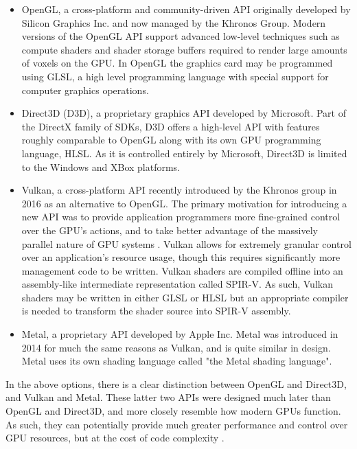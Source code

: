 \begin{itemize}
    \item OpenGL, a cross-platform and community-driven API originally developed by Silicon Graphics Inc. and now managed by the Khronos Group. Modern versions of the OpenGL API support advanced low-level techniques such as compute shaders and shader storage buffers required to render large amounts of voxels on the GPU. In OpenGL the graphics card may be programmed using GLSL, a high level programming language with special support for computer graphics operations.
    
    \item Direct3D (D3D), a proprietary graphics API developed by Microsoft. Part of the DirectX family of SDKs, D3D offers a high-level API with features roughly comparable to OpenGL along with its own GPU programming language, HLSL. As it is controlled entirely by Microsoft, Direct3D is limited to the Windows and XBox platforms.
    
    \item Vulkan, a cross-platform API recently introduced by the Khronos group in 2016 as an alternative to OpenGL. The primary motivation for introducing a new API was to provide application programmers more fine-grained control over the GPU's actions, and to take better advantage of the massively parallel nature of GPU systems . Vulkan allows for extremely granular control over an application's resource usage, though this requires significantly more management code to be written. Vulkan shaders are compiled offline into an assembly-like intermediate representation called SPIR-V. As such, Vulkan shaders may be written in either GLSL or HLSL but an appropriate compiler is needed to transform the shader source into SPIR-V assembly.
    
    \item Metal, a proprietary API developed by Apple Inc. Metal was introduced in 2014 for much the same reasons as Vulkan, and is quite similar in design. Metal uses its own shading language called "the Metal shading language".
\end{itemize}

In the above options, there is a clear distinction between OpenGL and Direct3D, and Vulkan and Metal. These latter two APIs were designed much later than OpenGL and Direct3D, and more closely resemble how modern GPUs function. As such, they can potentially provide much greater performance and control over GPU resources, but at the cost of code complexity \autocite{wyman2015vulkan}.

